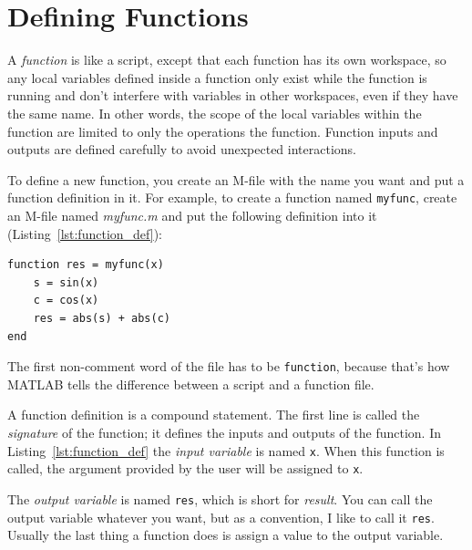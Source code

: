 \documentclass[../../book.tex]{subfiles}
\begin{document}
\section{Defining Functions}

A \emph{function} is like a script, except that each function has its own workspace, so any local variables defined
inside a function only exist while the function is running and don't
interfere with variables in other workspaces, even if they have the
same name.  In other words, the scope of the local variables within the function are limited to only the operations the function.
Function inputs and outputs are defined carefully to avoid
unexpected interactions.

To define a new function, you create an M-file with the name you
want and put a function definition in it.  For example, to create
a function named \lstinline{myfunc}, create an M-file named \emph{myfunc.m}
and put the following definition into it (Listing~\ref{lst:function_def}):


\begin{lstlisting}[caption={A function definition}, label={lst:function_def}]
function res = myfunc(x)
    s = sin(x)
    c = cos(x)
    res = abs(s) + abs(c)
end
\end{lstlisting}

The first non-comment word of the file has to be \lstinline{function}, because
that's how MATLAB tells the difference between a script and a function
file.


A function definition is a compound statement.  The first line
is called the \emph{signature} of the function; it defines
the inputs and outputs of the function.  In Listing~\ref{lst:function_def} the \emph{input variable} is named \lstinline{x}.  When this function is called, the
argument provided by the user will be assigned to \lstinline{x}.



The \emph{output variable} is named \lstinline{res}, which is short for
\emph{result}.  You can call the output variable whatever you want, but
as a convention, I like to call it \lstinline{res}.  Usually the last
thing a function does is assign a value to the output \mbox{variable}.
\end{document}
